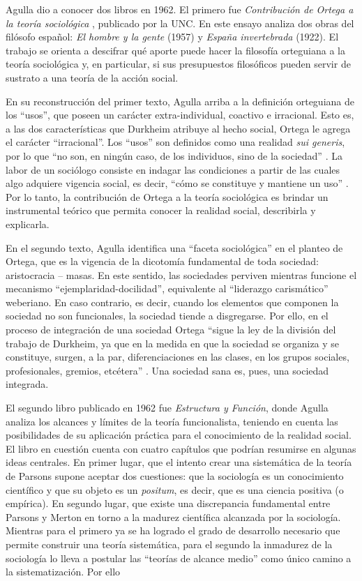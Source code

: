 Agulla dio a conocer dos libros en 1962. El primero fue \emph{Contribución de Ortega a la teoría sociológica} \parencite{1639-AGULLA1962}, publicado por la UNC. En este ensayo analiza dos obras del filósofo español: \emph{El hombre y la gente} (1957) y \emph{España invertebrada} (1922). El trabajo se orienta a descifrar qué aporte puede hacer la filosofía orteguiana a la teoría sociológica y, en particular, si sus presupuestos filosóficos pueden servir de sustrato a una teoría de la acción social.

En su reconstrucción del primer texto, Agulla arriba a la definición orteguiana de los \enquote{usos}, que poseen un carácter extra-individual, coactivo e irracional. Esto es, a las dos características que Durkheim atribuye al hecho social, Ortega le agrega el carácter \enquote{irracional}. Los \enquote{usos} son definidos como una realidad \emph{sui generis}, por lo que \enquote{no son, en ningún caso, de los individuos, sino de la sociedad} \parencite[34]{1639-AGULLA1962}. La labor de un sociólogo consiste en indagar las condiciones a partir de las cuales algo adquiere vigencia social, es decir, \enquote{cómo se constituye y mantiene un uso} \parencite[42]{1639-AGULLA1962}. Por lo tanto, la contribución de Ortega a la teoría sociológica es brindar un instrumental teórico que permita conocer la realidad social, describirla y explicarla.

En el segundo texto, Agulla identifica una \enquote{faceta sociológica} en el planteo de Ortega, que es la vigencia de la dicotomía fundamental de toda sociedad: aristocracia -- masas. En este sentido, las sociedades perviven mientras funcione el mecanismo \enquote{ejemplaridad-docilidad}, equivalente al \enquote{liderazgo carismático} weberiano. En caso contrario, es decir, cuando los elementos que componen la sociedad no son funcionales, la sociedad tiende a disgregarse. Por ello, en el proceso de integración de una sociedad Ortega \enquote{sigue la ley de la división del trabajo de Durkheim, ya que en la medida en que la sociedad se organiza y se constituye, surgen, a la par, diferenciaciones en las clases, en los grupos sociales, profesionales, gremios, etcétera} \parencite[61-62]{1639-AGULLA1962}. Una sociedad sana es, pues, una sociedad integrada.

El segundo libro publicado en 1962 fue \emph{Estructura y Función}, donde Agulla analiza los alcances y límites de la teoría funcionalista, teniendo en cuenta las posibilidades de su aplicación práctica para el conocimiento de la realidad social. El libro en cuestión cuenta con cuatro capítulos que podrían resumirse en algunas ideas centrales. En primer lugar, que el intento crear una sistemática de la teoría de Parsons supone aceptar dos cuestiones: que la sociología es un conocimiento científico y que su objeto es un \emph{positum}, es decir, que es una ciencia positiva (o empírica). En segundo lugar, que existe una discrepancia fundamental entre Parsons y Merton en torno a la madurez científica alcanzada por la sociología. Mientras para el primero ya se ha logrado el grado de desarrollo necesario que permite construir una teoría sistemática, para el segundo la inmadurez de la sociología lo lleva a postular las \enquote{teorías de alcance medio} como único camino a la sistematización. Por ello

